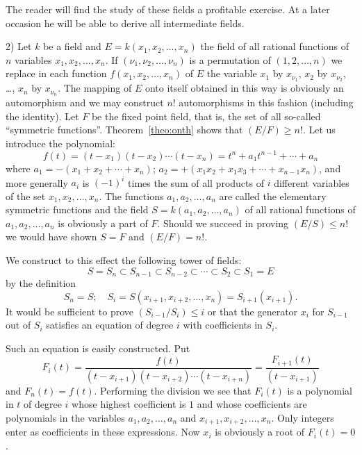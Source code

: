 \documentclass[10pt,leqno]{article}
\theoremstyle{definition}
\begin{document}
The reader will find the study of these fields a profitable exercise.
At a later occasion he will be able to derive all intermediate fields.


2)
Let $k$ be a field and $E = k(x_1, x_2, \ldots, x_n)$ the field of all rational functions of $n$ variables $x_1,x_2, \ldots, x_n$.
If $(\nu_1, \nu_2, \ldots, \nu_n)$ is a permutation of $(1,2,\ldots,n)$ we replace in each function $f(x_1,x_2,\ldots,x_n)$ of $E$ the variable $x_1$ by $x_{\nu_1}$, $x_2$ by $x_{\nu_2}$, \ldots, $x_n$ by $x_{\nu_n}$.
The mapping of $E$ onto itself obtained in this way is obviously an automorphism and we may construct $n!$ automorphisms in this fashion (including the identity).
Let $F$ be the fixed point field, that is, the set of all so-called ``symmetric functions''.
Theorem~\ref{theo:onth} shows that $(E/F) \geq n!$.
Let us introduce the polynomial:
\begin{equation}
\label{eq:twGth}
f(t) = (t-x_1)(t-x_2) \cdots (t-x_n)
= t^n + a_1 t^{n-1} + \cdots + a_n
\end{equation}
where $a_1 = -(x_1 + x_2 + \cdots + x_n)$; $a_2 = +(x_1x_2 + x_1x_3 + \cdots + x_{n-1}x_n)$, and more generally $a_i$ is $(-1)^i$ times the sum of all products of $i$ different variables of the set $x_1, x_2, \ldots, x_n$.
The functions $a_1, a_2, \ldots, a_n$ are called the elementary symmetric functions and the field $S = k(a_1, a_2, \ldots, a_n)$ of all rational functions of $a_1, a_2, \ldots, a_n$ is obviously a part of $F$.
Should we succeed in proving $(E/S) \leq n!$ we would have shown $S = F$ and $(E/F) = n!$.

We construct to this effect the following tower of fields:
\[
S = S_n
\subset S_{n-1}
\subset S_{n-2}
\subset \cdots
\subset S_2
\subset S_1 = E
\]
by the definition
\begin{equation}
\label{eq:twGfo}
S_n = S;
\quad
S_i = S(x_{i+1}, x_{i+2}, \ldots, x_n) = S_{i+1}(x_{i+1}).
\end{equation}
It would be sufficient to prove $(S_{i-1} / S_i) \leq i$ or that the generator $x_i$ for $S_{i-1}$ out of $S_i$ satisfies an equation of degree $i$ with coefficients in $S_i$.

Such an equation is easily constructed.
Put
\begin{equation}
\label{eq:twGfi}
F_i(t)
= \frac{f(t)}{(t-x_{i+1})(t-x_{i+2}) \cdots (t-x_{i+n})}
= \frac{F_{i+1}(t)}{(t-x_{i+1})}
\end{equation}
and $F_n(t) = f(t)$.
Performing the division we see that $F_i(t)$ is a polynomial in $t$ of degree $i$ whose highest coefficient is $1$ and whose coefficients are polynomials in the variables $a_1, a_2, \ldots, a_n$ and $x_{i+1}, x_{i+2}, \ldots, x_n$.
Only integers enter as coefficients in these expressions.
Now $x_i$ is obviously a root of $F_i(t) = 0$.
\end{document}
